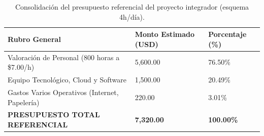 \begin{table}[H]
    \centering
    \small
    \caption{Consolidación del presupuesto referencial del proyecto integrador (esquema 4h/día).}
    \label{tab:presupuesto_total}
    \begin{tabularx}{\linewidth}{>{\raggedright\arraybackslash}X Y Y}
        \toprule
        \color{white}\textbf{Rubro General} & 
        \color{white}\textbf{Monto Estimado (USD)} & 
        \color{white}\textbf{Porcentaje (\%)} \\
        \midrule
        Valoración de Personal (800 horas a \$7.00/h) & 5,600.00 & 76.50\% \\
        Equipo Tecnológico, Cloud y Software & 1,500.00 & 20.49\% \\
        Gastos Varios Operativos (Internet, Papelería) & 220.00 & 3.01\% \\
        \midrule
        \textbf{PRESUPUESTO TOTAL REFERENCIAL} & \textbf{7,320.00} & \textbf{100.00\%} \\
        \bottomrule
    \end{tabularx}
\end{table}
